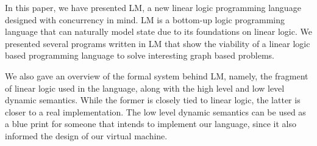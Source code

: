 In this paper, we have presented LM, a new linear logic programming language designed with concurrency in mind. LM is a bottom-up logic programming language
that can naturally model state due to its foundations on linear logic.
We presented several programs written in LM that show the viability of a linear logic based programming language to solve interesting graph based problems.

We also gave an overview of the formal system behind LM, namely, the fragment of linear logic used in the language, along with the high level and low level dynamic semantics.
While the former is closely tied to linear logic, the latter is closer to a real implementation. The low level dynamic semantics can be used as a blue print for someone that
intends to implement our language, since it also informed the design of our virtual machine.